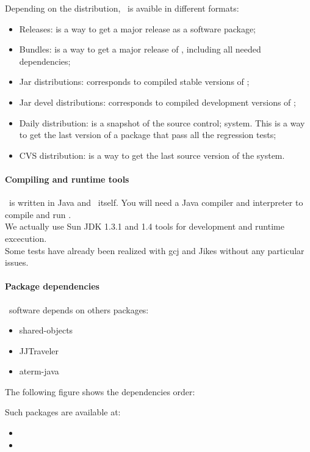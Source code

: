 Depending on the distribution, \TOM\ is avaible in different formats:
\begin{itemize}
\item Releases: is a way to get a major release as a software package;
\item Bundles: is  a way to get a major release of \TOM, including all
  needed dependencies;
\item Jar distributions: corresponds to compiled stable versions of \TOM;
\item Jar devel distributions: corresponds to compiled development versions of \TOM;
\item Daily distribution: is a snapshot of the source control;
  system. This is a way to get the last version of a package that pass
  all the regression tests;

\item CVS distribution: is a way to get the last source version of the
  system.
\end{itemize}

\paragraph{Compiling and runtime tools}
\TOM\ is written in Java and \TOM\ itself. You will need a Java
compiler and interpreter to compile and run \TOM. 
\\We actually use Sun JDK 1.3.1 and 1.4 tools for development and runtime
excecution.
\\Some tests have already been realized with gcj
and Jikes without any particular issues.

\paragraph{Package dependencies}
\TOM\ software depends on others packages:
\begin{itemize}
\item shared-objects
\item JJTraveler
\item aterm-java
\end{itemize}
The following figure shows the dependencies order:


Such packages are available at:
\begin{itemize}
\item {}
\item {}
\end{itemize}    

